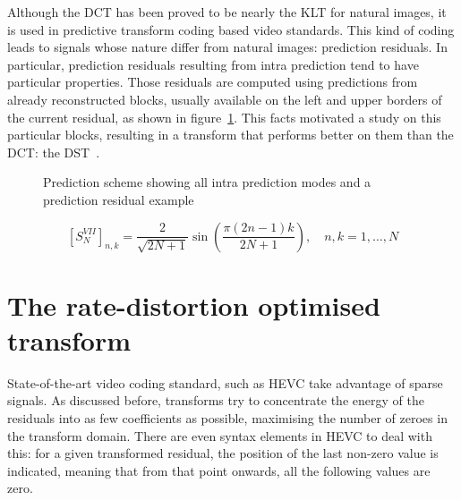\documentclass[11pt,a4paper,openright,twoside]{book}
\numberwithin{equation}{section} %
\begin{document}
Although the \ac{DCT} has been proved to be nearly the \ac{KLT} for natural
images, it is used in predictive transform coding based video standards.
This kind of coding leads to signals whose nature differ from natural
images: prediction residuals.
In particular, prediction residuals resulting from intra prediction tend
to have particular properties.
Those residuals are computed using predictions from already
reconstructed blocks, usually available on the left and upper borders of
the current residual, as shown in figure~\ref{fig:pred_scheme}.
This facts motivated a study on this particular blocks, resulting in a
transform that performs better on them than the \ac{DCT}: the
\ac{DST}~\cite{han-10-spatial-adaptive-transform}.
\begin{figure}[tb]
	\centering
	\hspace{0.2\linewidth}
	\caption{Prediction scheme showing all intra prediction modes and a
	prediction residual example}
	\label{fig:pred_scheme}
\end{figure}

\begin{equation}
	{\left[S_{N}^{VII} \right]}_{n,k} =
	\frac{2}{\sqrt{2N+1}}\sin\left(\frac{\pi(2n-1)k}{2N+1}\right),
	\quad
	n,k = 1, \dots, N
	\label{eqn:dst_vii}
\end{equation}

\section{The rate-distortion optimised transform}
\label{sec:the_rate_distortion_optimised_transform}

State-of-the-art video coding standard, such as \ac{HEVC} take advantage
of sparse signals.
As discussed before, transforms try to concentrate the energy of the
residuals into as few coefficients as possible, maximising the number of
zeroes in the transform domain.
There are even syntax elements in \ac{HEVC} to deal with this:
for a given transformed residual, the position of the last non-zero
value is indicated, meaning that from that point onwards, all the
following values are zero.
\end{document}
